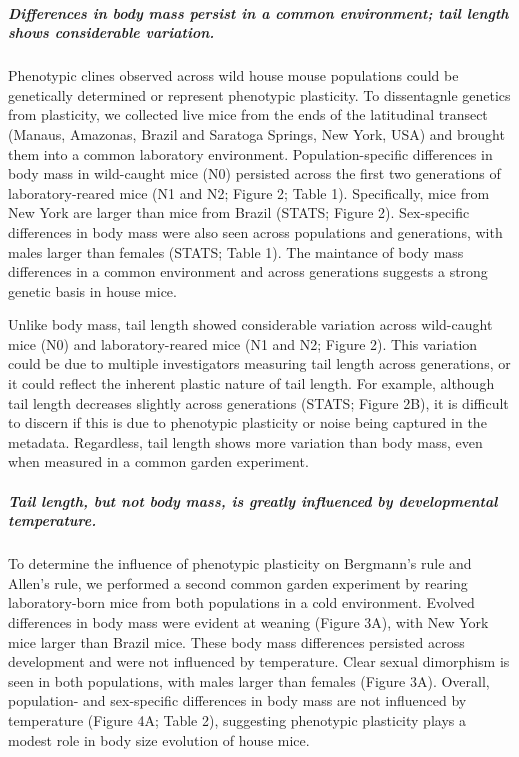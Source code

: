 \documentclass[]{article}
\let\oldsubparagraph\subparagraph
\renewcommand{\subparagraph}[1]{\oldsubparagraph{#1}\mbox{}}
\begin{document}
\hypertarget{differences-in-body-mass-persist-in-a-common-environment-tail-length-shows-considerable-variation.}{%
\subparagraph{\texorpdfstring{\emph{Differences in body mass persist in
a common environment; tail length shows considerable
variation.}}{Differences in body mass persist in a common environment; tail length shows considerable variation.}}\label{differences-in-body-mass-persist-in-a-common-environment-tail-length-shows-considerable-variation.}}

Phenotypic clines observed across wild house mouse populations could be
genetically determined or represent phenotypic plasticity. To
dissentagnle genetics from plasticity, we collected live mice from the
ends of the latitudinal transect (Manaus, Amazonas, Brazil and Saratoga
Springs, New York, USA) and brought them into a common laboratory
environment. Population-specific differences in body mass in wild-caught
mice (N0) persisted across the first two generations of
laboratory-reared mice (N1 and N2; Figure 2; Table 1). Specifically,
mice from New York are larger than mice from Brazil (STATS; Figure 2).
Sex-specific differences in body mass were also seen across populations
and generations, with males larger than females (STATS; Table 1). The
maintance of body mass differences in a common environment and across
generations suggests a strong genetic basis in house mice.

Unlike body mass, tail length showed considerable variation across
wild-caught mice (N0) and laboratory-reared mice (N1 and N2; Figure 2).
This variation could be due to multiple investigators measuring tail
length across generations, or it could reflect the inherent plastic
nature of tail length. For example, although tail length decreases
slightly across generations (STATS; Figure 2B), it is difficult to
discern if this is due to phenotypic plasticity or noise being captured
in the metadata. Regardless, tail length shows more variation than body
mass, even when measured in a common garden experiment.

\hypertarget{tail-length-but-not-body-mass-is-greatly-influenced-by-developmental-temperature.}{%
\subparagraph{\texorpdfstring{\emph{Tail length, but not body mass, is
greatly influenced by developmental
temperature.}}{Tail length, but not body mass, is greatly influenced by developmental temperature.}}\label{tail-length-but-not-body-mass-is-greatly-influenced-by-developmental-temperature.}}

To determine the influence of phenotypic plasticity on Bergmann's rule
and Allen's rule, we performed a second common garden experiment by
rearing laboratory-born mice from both populations in a cold
environment. Evolved differences in body mass were evident at weaning
(Figure 3A), with New York mice larger than Brazil mice. These body mass
differences persisted across development and were not influenced by
temperature. Clear sexual dimorphism is seen in both populations, with
males larger than females (Figure 3A). Overall, population- and
sex-specific differences in body mass are not influenced by temperature
(Figure 4A; Table 2), suggesting phenotypic plasticity plays a modest
role in body size evolution of house mice.
\end{document}
